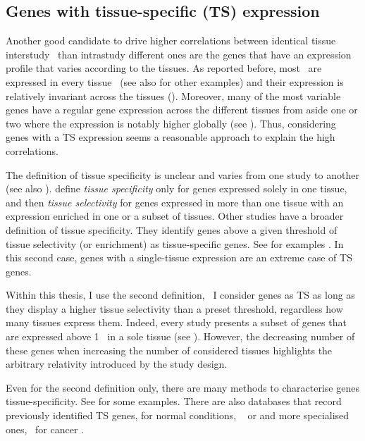 \subsection{Genes with tissue-specific (TS) expression}\label{sub:TisSpeGene}
\vspace{-0.15in}
Another good candidate to drive higher correlations
between identical tissue interstudy \treps\ than intrastudy different ones
are the genes that have an expression profile
that varies according to the tissues.
As reported before,
most \mRNAs\ are expressed in every tissue~
(see also \citet{Uhlen2015,GTExTranscript} for other examples) and
their expression is relatively invariant across the tissues ().
Moreover,
many of the most variable genes
have a regular gene expression across the different tissues
from aside one or two where the expression is notably higher globally
(see ).
Thus,
considering genes with a \gls{TS} expression
seems a reasonable approach to explain the high correlations.

The definition of tissue specificity is unclear and
varies from one study to another (see also \citet{Santos2015-rj}).
\citet{Liang2006-mk} define \emph{tissue specificity}
only for genes expressed solely in one tissue,
and then \emph{tissue selectivity} for genes expressed in more than one tissue
with an expression enriched in one or a subset of tissues.
Other studies have a broader definition of tissue specificity.
They identify genes above a given threshold of tissue selectivity (or enrichment)
as tissue-specific genes.
See for examples \citet{Uhlen2014,Jiang2016-sv}.
In this second case,
genes with a single-tissue expression are an extreme case of \gls{TS} genes.

Within this thesis, I use the second definition,
\ie\ I consider genes as \gls{TS}
as long as they display a higher tissue selectivity than a preset threshold,
regardless how many tissues express them.
Indeed, every study presents a subset of genes
that are expressed above 1 \FPKM\
in a sole tissue (see ).
However, the decreasing number of these genes
when increasing the number of considered tissues highlights
the arbitrary relativity introduced by the study design.

Even for the second definition only,
there are many methods to characterise genes tissue-specificity.
See \citet{Cavalli2011-bo,Xiao2010-mz,Karthik2016-mu,Kim2017-dz,%
Kryuchkova-Mostacci2017-mk,Kadota2006-eb,Yu2006-ha,Martinez2008-bm}
for some examples.
There are also databases that record previously identified \gls{TS} genes,
for normal conditions,
\eg\  or
and more specialised ones, \eg\ for cancer
.

